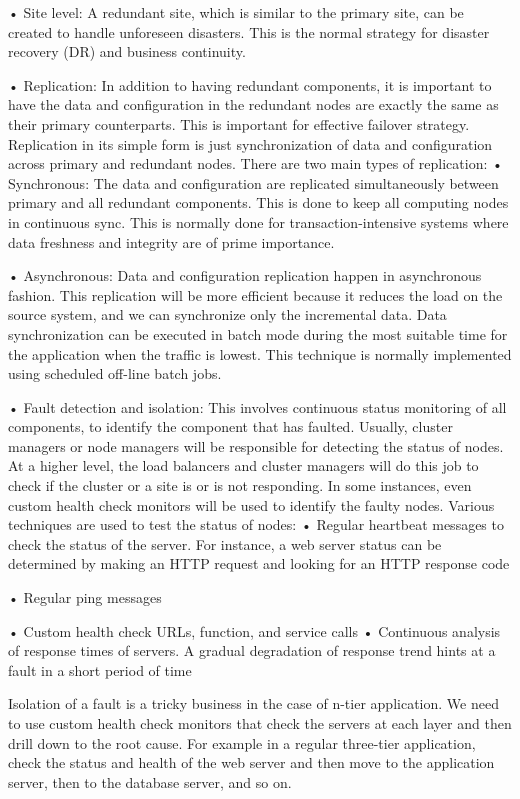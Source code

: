 • Site level: A redundant site, which is similar to the primary site, can be created to handle unforeseen disasters. This is the normal strategy for disaster recovery (DR) and business continuity.


• Replication: In addition to having redundant components, it is important to have the data and configuration in the redundant nodes are exactly the same as their primary counterparts. This is important for effective failover strategy. Replication in its simple form is just synchronization of data and configuration across primary and redundant nodes. There are two main types of replication:
• Synchronous: The data and configuration are replicated simultaneously between primary and all redundant components. This is done to keep all computing nodes in continuous sync. This is normally done for transaction-intensive systems where data freshness and integrity are of prime importance.

• Asynchronous: Data and configuration replication happen in asynchronous fashion. This replication will be more efficient because it reduces the load on the source system, and we can synchronize only the incremental data. Data synchronization can be executed in batch mode during the most suitable time for the application when the traffic is lowest. This technique is normally implemented using scheduled off-line batch jobs.


• Fault detection and isolation: This involves continuous status monitoring of all components, to identify the component that has faulted. Usually, cluster managers or node managers will be responsible for detecting the status of nodes. At a higher level, the load balancers and cluster managers will do this job to check if the cluster or a site is or is not responding. In some instances, even custom health check monitors will be used to identify the faulty nodes. Various techniques are used to test the status of nodes:
• Regular heartbeat messages to check the status of the server. For instance, a web server status can be determined by making an HTTP request and looking for an HTTP response code

• Regular ping messages

• Custom health check URLs, function, and service calls
• Continuous analysis of response times of servers. A gradual degradation of response trend hints at a fault in a short period of time

Isolation of a fault is a tricky business in the case of n-tier application. We need to use custom health check monitors that check the servers at each layer and then drill down to the root cause. For example in a regular three-tier application, check the status and health of the web server and then move to the application server, then to the database server, and so on.

